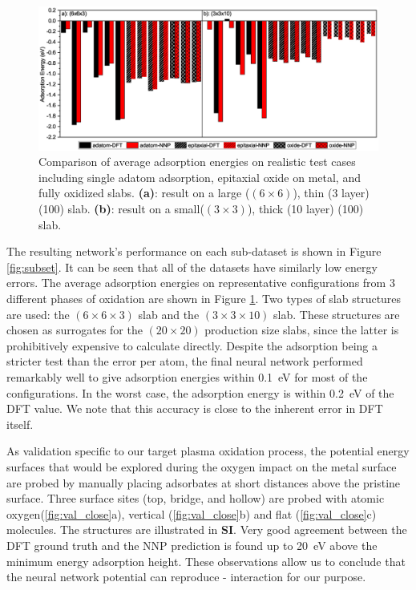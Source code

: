 \documentclass[manuscript=cmatex]{achemso}
\begin{document}
\begin{figure}[h]
  \centering
  \includegraphics[width=\textwidth]{val_ads}
  \caption[Comparison of adsorption energies calculated using DFT and NNP]{Comparison of average adsorption energies on realistic test cases including single adatom adsorption, epitaxial oxide on metal, and fully oxidized slabs. \textbf{(a)}: result on a large ($(6\times6)$), thin (3 layer) (100) slab. \textbf{(b)}: result on a small($(3\times3)$), thick (10 layer) (100) slab.} 
  \label{fig:val_ads}
\end{figure}

The resulting network's performance on each sub-dataset is shown in Figure \ref{fig:subset}. It can be seen that all of the datasets have similarly low energy errors. The average adsorption energies on representative configurations from 3 different phases of oxidation are shown in Figure \ref{fig:val_ads}. Two types of slab structures are used: the $(6\times6\times3)$ slab and the $(3\times3\times10)$ slab. These structures are chosen as surrogates for the $(20\times20)$ production size slabs, since the latter is prohibitively expensive to calculate directly. Despite the adsorption being a stricter test than the error per atom, the final neural network performed remarkably well to give adsorption energies within \SI{0.1}{eV} for most of the configurations. In the worst case, the adsorption energy is within \SI{0.2}{eV} of the DFT value. We note that this accuracy is close to the inherent error in DFT itself.

As validation specific to our target plasma oxidation process, the potential energy surfaces that would be explored during the oxygen impact on the metal surface are probed by manually placing adsorbates at short distances above the pristine  surface. Three surface sites (top, bridge, and hollow) are probed with atomic oxygen(\ref{fig:val_close}a), vertical (\ref{fig:val_close}b) and flat (\ref{fig:val_close}c)  molecules. The structures are illustrated in \textbf{SI}. Very good agreement between the DFT ground truth and the NNP prediction is found up to \SI{20}{eV} above the minimum energy adsorption height. These observations allow us to conclude that the neural network potential can reproduce - interaction for our purpose.
\end{document}

